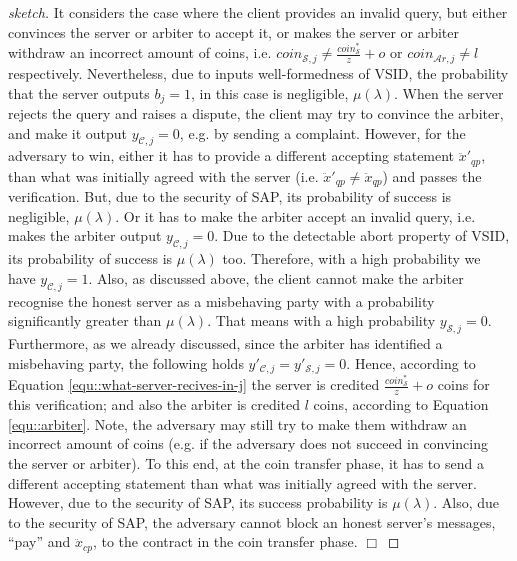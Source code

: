 \begin{proof}[sketch]
       It considers the case where the client provides an invalid query, but  either convinces the server or arbiter to accept it, or  makes the server or arbiter  withdraw an incorrect amount of coins, i.e. $coin_{\scriptscriptstyle\mathcal{S},j}\neq \frac{coin_{\scriptscriptstyle\mathcal S}^{\scriptscriptstyle*}}{z}+o$ or  $coin_{\scriptscriptstyle\mathcal{A}r,j}\neq l$ respectively. Nevertheless, due to inputs well-formedness of VSID, the probability that the server outputs $b_{\scriptscriptstyle j}=1$, in this case is negligible, $\mu(\lambda)$. When the server rejects the query and raises a dispute, the client may try to convince the arbiter, and make it output $y_{\scriptscriptstyle \mathcal {C},j}=0$, e.g. by sending a complaint. However, for the adversary to win, either it has to provide a different accepting statement $\ddot{x}'_{\scriptscriptstyle qp}$, than what was initially agreed with the server (i.e. $\ddot{x}'_{\scriptscriptstyle qp}\neq \ddot{x}_{\scriptscriptstyle qp}$) and passes the verification. But,  due to the security of SAP, its probability of success is negligible, $\mu(\lambda)$. Or it has to make the arbiter  accept an invalid query, i.e. makes the arbiter output $y_{\scriptscriptstyle\mathcal{C},j}=0$. Due to the detectable abort property of VSID, its probability of success is  $\mu(\lambda)$ too. Therefore, with a high probability we have $y_{\scriptscriptstyle\mathcal{C},j}=1$. Also, as discussed above, the client cannot make the arbiter recognise the  honest server as a misbehaving party with a probability significantly greater than $\mu(\lambda)$. That means with a high probability $y_{\scriptscriptstyle\mathcal{S},j}=0$. Furthermore, as we already discussed, since the arbiter 
has identified a misbehaving party, the following holds $y'_{\scriptscriptstyle\mathcal{C},j}=y'_{\scriptscriptstyle\mathcal{S},j}=0$.  Hence, according to Equation \ref{equ::what-server-recives-in-j} the server is credited  $\frac{coin_{\scriptscriptstyle\mathcal S}^{\scriptscriptstyle*}}{z}+o$ coins for this verification; and also the arbiter is credited $l$ coins, according to Equation \ref{equ::arbiter}.  Note,  the adversary may still try to  make them withdraw an incorrect amount of coins (e.g. if the adversary does not succeed in convincing the server or arbiter). To this end, at the coin transfer phase, it has to send a  different accepting statement  than what was initially agreed with the server. However, due to the security of SAP, its  success probability is  $\mu(\lambda)$. Also, due to the security of SAP, the adversary cannot block an honest server's  messages, ``pay'' and $\ddot{x}_{\scriptscriptstyle cp}$, to the contract in the coin transfer phase.
 \hfill\(\Box\)\end{proof}
  
